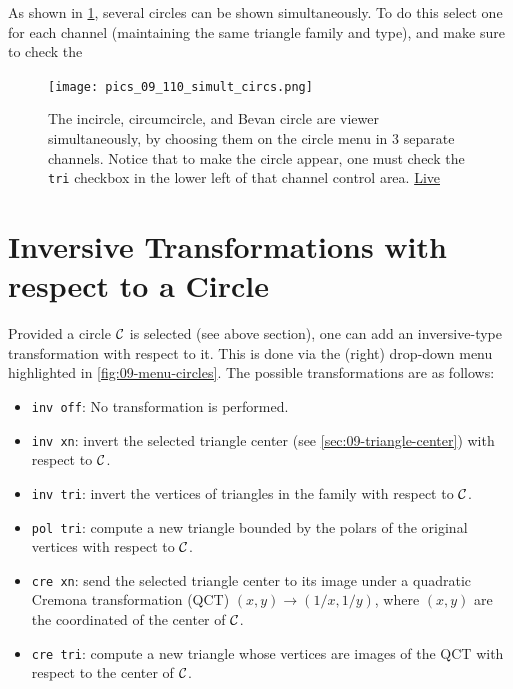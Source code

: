 As shown in \cref{fig:09-three-circles}, several circles can be shown simultaneously. To do this select one for each channel (maintaining the same triangle family and type), and make sure to check the 

\begin{figure}
    \centering
    \texttt{[image: pics\_09\_110\_simult\_circs.png]}
    \caption{The incircle, circumcircle, and Bevan circle are viewer simultaneously, by choosing them on the circle menu in 3 separate channels. Notice that to make the circle appear, one must check the \texttt{tri} checkbox in the lower left of that channel control area. \href{https://bit.ly/3poF5YQ}{Live}}
    \label{fig:09-three-circles}
\end{figure}

\section{Inversive Transformations with respect to a Circle}

Provided a circle $\mathcal{C}$ is selected (see above section), one can add an inversive-type transformation with respect to it. This is done via the (right) drop-down menu highlighted in \cref{fig:09-menu-circles}. The possible transformations are as follows: 

\begin{itemize}
    \item \texttt{inv off}: No transformation is performed.
    \item \texttt{inv xn}: invert the selected triangle center (see \cref{sec:09-triangle-center}) with respect to $\mathcal{C}$.
    \item \texttt{inv tri}: invert the vertices of triangles in the family with respect to $\mathcal{C}$.
    \item \texttt{pol tri}: compute a new triangle bounded by the polars of the original vertices with respect to $\mathcal{C}$.
    \item \texttt{cre xn}: send the selected triangle center to its image under a quadratic Cremona transformation (QCT) $(x,y)\rightarrow(1/x,1/y)$, where $(x,y)$ are the coordinated of the center of $\mathcal{C}$. 
    \item \texttt{cre tri}: compute a new triangle whose vertices are images of the QCT with respect to the center of $\mathcal{C}$.
\end{itemize}
